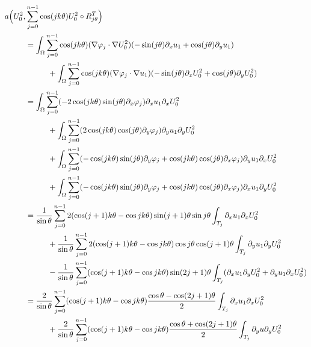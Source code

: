 \vspace*{-1\baselineskip}
\bgroup\smaller
\begin{align*}
a\Bigl(U_0^2,&\sum_{j=0}^{n-1} \cos(jk\theta) U_0^2 \circ R_{j\theta}^T\Bigr) \\
&= \int_\Omega \sum_{j=0}^{n-1} \cos(jk\theta)(\nabla \varphi_j\cdot \nabla U_0^2)(-\sin(j\theta) \partial_x u_1+\cos (j\theta)\partial_y u_1) \\
&\hspace*{1cm}+ \int_\Omega \sum_{j=0}^{n-1}\cos(jk\theta) (\nabla \varphi_j\cdot \nabla u_1)(-\sin(j\theta) \partial_x U_0^2 +\cos(j\theta) \partial_y U_0^2) \\
&= \int_\Omega \sum_{j=0}^{n-1} (-2 \cos(jk\theta)\sin(j\theta)\partial_x \varphi_j) \partial_x u_1 \partial_x U_0^2 \\
&\hspace*{1cm}+ \int_\Omega \sum_{j=0}^{n-1}(2\cos(jk\theta)\cos(j\theta)\partial_y \varphi_j) \partial_y u_1 \partial_y U_0^2 \\
&\hspace*{1cm}+ \int_\Omega \sum_{j=0}^{n-1} (-\cos(jk\theta)\sin(j\theta)\partial_y \varphi_j+\cos(jk\theta)\cos(j\theta)\partial_x \varphi_j) \partial_y u_1 \partial_x U_0^2 \\
&\hspace*{1cm}+ \int_\Omega \sum_{j=0}^{n-1} (-\cos(jk\theta)\sin(j\theta)\partial_y \varphi_j+\cos(jk\theta)\cos(j\theta)\partial_x \varphi_j) \partial_x u_1 \partial_y U_0^2\\
&=\frac{1}{\sin \theta}\sum_{j=0}^{n-1}2 (\cos(j+1)k\theta-\cos jk\theta)\sin(j+1)\theta\sin j\theta \int_{T_j} \partial_x u_1 \partial_x U_0^2\\
&\hspace*{1cm}+\frac{1}{\sin \theta}\sum_{j=0}^{n-1} 2(\cos(j+1)k\theta-\cos jk\theta)\cos j \theta\cos (j+1)\theta \int_{T_j} \partial_y u_1 \partial_y U_0^2\\
&\hspace*{1cm}-\frac{1}{\sin \theta}\sum_{j=0}^{n-1} (\cos(j+1)k\theta-\cos jk\theta)\sin(2j+1)\theta
\int_{T_j} (\partial_x u_1 \partial_y U_0^2 + \partial_y u_1 \partial_x U_0^2)\\
&=
\frac{2}{\sin \theta}\sum_{j=0}^{n-1} (\cos(j+1)k\theta - \cos jk\theta) \frac{\cos \theta-\cos(2j+1)\theta}{2} \int_{T_j}\partial_x u_1 \partial_x U_0^2\\
&\hspace*{1cm}+
\frac{2}{\sin \theta}\sum_{j=0}^{n-1} (\cos(j+1)k\theta - \cos jk\theta) \frac{\cos \theta+\cos(2j+1)\theta}{2} \int_{T_j}\partial_y u \partial_y U_0^2\\

\end{align*}
